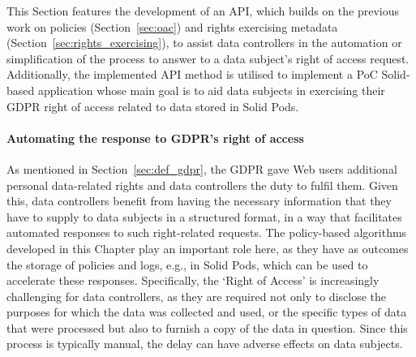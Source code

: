 
This Section features the development of an API, which builds on the previous work on policies (Section~\ref{sec:oac}) and rights exercising metadata (Section~\ref{sec:rights_exercising}), to assist data controllers in the automation or simplification of the process to answer to a data subject's right of access request.
Additionally, the implemented API method is utilised to implement a PoC Solid-based application whose main goal is to aid data subjects in exercising their GDPR right of access related to data stored in Solid Pods.

\paragraph{Automating the response to GDPR's right of access}
As mentioned in Section~\ref{sec:def_gdpr}, the GDPR gave Web users additional personal data-related rights and data controllers the duty to fulfil them.
Given this, data controllers benefit from having the necessary information that they have to supply to data subjects in a structured format, in a way that facilitates automated responses to such right-related requests.
The policy-based algorithms developed in this Chapter play an important role here, as they have as outcomes the storage of policies and logs, e.g., in Solid Pods, which can be used to accelerate these responses.
Specifically, the `Right of Access' is increasingly challenging for data controllers, as they are required not only to disclose the purposes for which the data was collected and used, or the specific types of data that were processed but also to furnish a copy of the data in question.
Since this process is typically manual, the delay can have adverse effects on data subjects.

